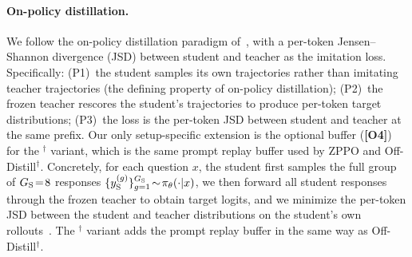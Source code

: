 \documentclass{llmxive}
\begin{document}
\paragraph{On-policy distillation.}
We follow the on-policy distillation paradigm of~\citet{agarwal2024policy}, with a per-token Jensen--Shannon divergence (JSD) between student and teacher as the imitation loss. Specifically: (P1)~the student samples its own trajectories rather than imitating teacher trajectories (the defining property of on-policy distillation); (P2)~the frozen teacher rescores the student's trajectories to produce per-token target distributions; (P3)~the loss is the per-token JSD between student and teacher at the same prefix. Our only setup-specific extension is the optional buffer (\textbf{[O4]}) for the $^{\dagger}$ variant, which is the same prompt replay buffer used by ZPPO and Off-Distill$^{\dagger}$. Concretely, for each question $x$, the student first samples the full group of $G_{\rm S}\!=\!8$ responses $\{y_{\rm S}^{(g)}\}_{g=1}^{G_{\rm S}}\!\sim\!\pi_\theta(\cdot|x)$, we then forward all student responses through the frozen teacher to obtain target logits, and we minimize the per-token JSD between the student and teacher distributions on the student's own rollouts~\citep{agarwal2024policy,ko2024distillm}. The $^{\dagger}$ variant adds the prompt replay buffer in the same way as Off-Distill$^{\dagger}$.
\end{document}
